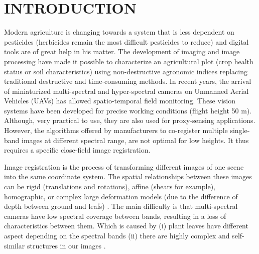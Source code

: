 \documentclass[a4paper,twoside]{article}
\begin{document}
	\onecolumn \maketitle \normalsize \setcounter{footnote}{0} \vfill
	
	\section{\uppercase{Introduction}}
	
	\par Modern agriculture is changing towards a system that is less dependent on pesticides \cite{10.1371/journal.pone.0097922}
	(herbicides remain the most difficult pesticides to reduce) and digital tools are of great help in his matter.
	The development of imaging and image processing have made it possible to characterize an agricultural plot \cite{SANKARAN2015112}
	(crop health status or soil characteristics) using non-destructive agronomic indices %
	\cite{doi:10.1080/02757259509532298, filella1995evaluating, 10.1371/journal.pone.0072736}
	replacing traditional destructive and time-consuming methods.
	In recent years, the arrival of miniaturized multi-spectral and hyper-spectral cameras on Unmanned Aerial Vehicles (UAVs)
	has allowed spatio-temporal field monitoring. These vision systems have been developed for precise working conditions (flight height 50 m).
	Although, very practical to use, they are also used for proxy-sensing applications.
	However, the algorithms	offered by manufacturers to co-register multiple single-band images at different spectral range,
	are not optimal for low heights. It thus requires a specific close-field image registration.
	\\
	\par Image registration is the process of transforming different images of one scene into the same coordinate system.
	The spatial relationships between these images can be rigid (translations and rotations), affine (shears for example),
	homographic, or complex large deformation models (due to the difference of depth between ground and leafs) \cite{Kamoun}.
	The main difficulty is that multi-spectral cameras have low spectral coverage between bands, resulting in a loss of characteristics between them.
	Which is caused by (i) plant leaves have different aspect depending on the spectral bands
	(ii) there are highly complex and self-similar structures in our images \cite{douarre:hal-02183837}.
\end{document}
